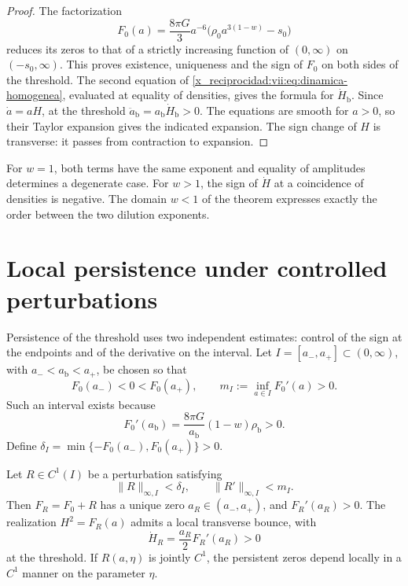 \begin{proof}
The factorization
\[
 F_0(a)=\frac{8\pi G}{3}a^{-6}
             \bigl(\rho_0a^{3(1-w)}-s_0\bigr)
\]
reduces its zeros to that of a strictly increasing function of
\((0,\infty)\) on \((-s_0,\infty)\). This proves existence,
uniqueness and the sign of \(F_0\) on both sides of the threshold.
The second equation of \eqref{x_reciprocidad:vii:eq:dinamica-homogenea}, evaluated
at equality of densities, gives the formula for \(\dot H_{\mathrm b}\).
Since \(\dot a=aH\), at the threshold
\(\ddot a_{\mathrm b}=a_{\mathrm b}\dot H_{\mathrm b}>0\).
The equations are smooth for \(a>0\), so their Taylor
expansion gives the indicated expansion. The sign change of \(H\) is
transverse: it passes from contraction to expansion.
\end{proof}

For \(w=1\), both terms have the same exponent and equality of
amplitudes determines a degenerate case. For \(w>1\), the sign of
\(\dot H\) at a coincidence of densities is negative.
The domain \(w<1\) of the theorem expresses exactly the order between the
two dilution exponents.

\section{Local persistence under controlled perturbations}
\label{x_reciprocidad:vii:sec:persistencia}

Persistence of the threshold uses two independent estimates:
control of the sign at the endpoints and of the derivative on the
interval. Let \(I=[a_-,a_+]\subset(0,\infty)\), with
\(a_-<a_{\mathrm b}<a_+\), be chosen so that
\[
 F_0(a_-)<0<F_0(a_+),\qquad
 m_I:=\inf_{a\in I}F_0'(a)>0.
\]
Such an interval exists because
\[
 F_0'(a_{\mathrm b})
   =\frac{8\pi G}{a_{\mathrm b}}(1-w)\rho_{\mathrm b}>0.
\]
Define
\(\delta_I=\min\{-F_0(a_-),F_0(a_+)\}>0\).

\begin{theorem}
\label{x_reciprocidad:vii:thm:persistencia}
Let \(R\in C^1(I)\) be a perturbation satisfying
\[
 \|R\|_{\infty,I}<\delta_I,\qquad
 \|R'\|_{\infty,I}<m_I.
\]
Then \(F_R=F_0+R\) has a unique zero \(a_R\in(a_-,a_+)\), and
\(F_R'(a_R)>0\). The realization \(H^2=F_R(a)\) admits a local
transverse bounce, with
\[
 \dot H_R=\frac{a_R}{2}F_R'(a_R)>0
\]
at the threshold. If \(R(a,\eta)\) is jointly \(C^1\), the persistent
zeros depend locally in a \(C^1\) manner on the parameter \(\eta\).
\end{theorem}


